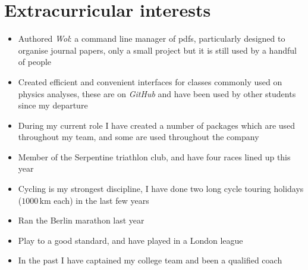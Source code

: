 \section{Extracurricular interests}


{
  \begin{itemize}
    \item Authored \textit{Wol}: a command line manager of pdfs,
      particularly designed to organise journal papers,
      only a small project but it is still used by a handful of people
    \item Created efficient and convenient \cpp interfaces for classes commonly used on
      physics analyses, these are on \textit{GitHub} and have been used by other
      students since my departure
    \item During my current role I have created a number of packages which are used throughout my
      team, and some are used throughout the company
  \end{itemize}
}

\vspace{-1em}

{
  \begin{itemize}
    \item Member of the Serpentine triathlon club, and have four races lined up this year
    \item Cycling is my strongest discipline, I have done two long cycle touring holidays
      ($1000\,\textrm{km}$ each) in the last few years
    \item Ran the Berlin marathon last year
  \end{itemize}
}

\vspace{-1em}

{
  \begin{itemize}
    \item Play to a good standard, and have played in a London league
    \item In the past I have captained my college team and been a qualified coach
  \end{itemize}
}

\vspace{-1em}



